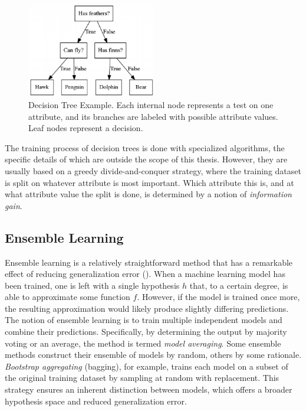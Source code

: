 \begin{figure}[h]
    \centering
    \includegraphics[width=0.5\textwidth]{Images/bt_decision_tree.png}
    \caption{Decision Tree Example. Each internal node represents a test on one attribute, and its branches are labeled with possible attribute values. Leaf nodes represent a decision.}
    \label{fig:bt_decision_tree}
\end{figure}

The training process of decision trees is done with specialized algorithms, the specific details of which are outside the scope of this thesis. However, they are usually based on a greedy divide-and-conquer strategy, where the training dataset is split on whatever attribute is most important. Which attribute this is, and at what attribute value the split is done, is determined by a notion of \textit{information gain}. 

\subsection{Ensemble Learning}

Ensemble learning is a relatively straightforward method that has a remarkable effect of reducing generalization error (\cite{goodfellow2016}). When a machine learning model has been trained, one is left with a single hypothesis $h$ that, to a certain degree, is able to approximate some function $f$. However, if the model is trained once more, the resulting approximation would likely produce slightly differing predictions. The notion of ensemble learning is to train multiple independent models and combine their predictions. Specifically, by determining the output by majority voting or an average, the method is termed \textit{model averaging}. 
Some ensemble methods construct their ensemble of models by random, others by some rationale. \textit{Bootstrap aggregating} (bagging), for example, trains each model on a subset of the original training dataset by sampling at random with replacement. This strategy ensures an inherent distinction between models, which offers a broader hypothesis space and reduced generalization error.





